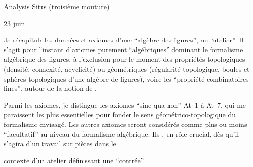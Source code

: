 \begin{center}Analysis Situs (troisième mouture)\end{center}

\uline{23 juin}

Je récapitule les données et axiomes d'une ``algèbre des figures'', ou ``\uline{atelier}''. Il s'agit pour l'instant d'axiomes purement ``algébriques'' dominant le formalisme algébrique des figures, à l'exclusion pour le moment des propriétés topologiques (densité, connexité, acyclicité) ou  géométriques (régularité topologique, boules et sphères topologiques d'une algèbre de figures), voire les ``propriété combinatoires fines'', autour de la notion de .

Parmi les axiomes, je distingue les axiomes ``sine qua non'' At~1 à At~7, qui me paraissent les plus essentielles pour fonder le sens géométrico-topologique du formalisme envisagé. Les autres axiomes seront considérés comme plus ou moins ``facultatif'' au niveau du formalisme algébrique. Ils  ,  un rôle crucial, dès qu'il s'agira d'un travail sur pièces dans le

contexte d'un atelier définissant une ``contrée''.

